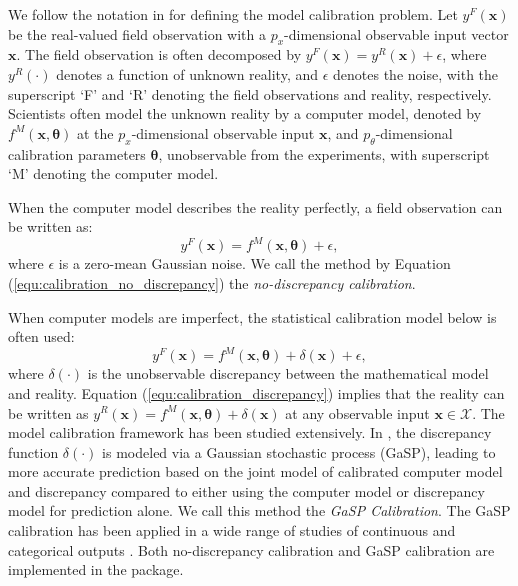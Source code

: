 We follow the notation in \cite{bayarri2007computer} for defining the model calibration problem. Let $y^F(\mathbf x)$ be the real-valued field observation with a $p_x$-dimensional observable input vector $\mathbf x$. The field observation is often decomposed by $y^F(\mathbf x)=y^R(\mathbf x)+\epsilon$, where $y^R(\cdot)$ denotes a function of unknown reality, and $\epsilon$ denotes the noise, with the superscript `F' and `R' denoting the field observations and reality, respectively.  
 Scientists often model the unknown reality by a computer model, denoted by $ f^M(\mathbf x, \bm \theta)$ at the $p_x$-dimensional observable input $\mathbf  x$, and $p_{\theta}$-dimensional calibration parameters $\bm \theta $, unobservable from the experiments, with superscript `M' denoting the computer model. 
 
 When the computer model describes the reality perfectly, a field observation can be written as:
\begin{equation}
y^F(\mathbf x)= f^M(\mathbf x, \bm \theta)+ \epsilon,
\label{equ:calibration_no_discrepancy}
\end{equation}
where  $\epsilon$ is a zero-mean Gaussian noise.  We call the method by Equation (\ref{equ:calibration_no_discrepancy}) the \textit{no-discrepancy calibration}.

When  computer models are imperfect, the statistical calibration model below is often used: 
\begin{equation}
y^F(\mathbf x)= f^M(\mathbf x, \bm \theta)+ \delta(\mathbf x)+\epsilon,
\label{equ:calibration_discrepancy}
\end{equation}
where $\delta(\cdot)$ is the unobservable discrepancy between the mathematical model and reality. Equation (\ref{equ:calibration_discrepancy}) implies that the reality can be written as $y^R(\mathbf x)= f^M(\mathbf x, \bm \theta)+ \delta(\mathbf x)$ at any observable input $\mathbf x \in \mathcal X$.  The model calibration framework has been studied extensively. In \cite{kennedy2001bayesian},  the discrepancy function $\delta(\cdot)$ is modeled via a Gaussian stochastic process (GaSP), leading to more accurate  prediction based on the joint model of calibrated computer model and discrepancy compared to either using the computer model  or discrepancy model for prediction alone.  We call this method the \textit{GaSP Calibration}. The GaSP calibration has been applied in a wide range of studies  of continuous and categorical outputs \citep{bayarri2007computer,higdon2008computer,paulo2012calibration,chang2016calibrating,chang2022ice}. Both no-discrepancy calibration and GaSP calibration are implemented in the  package.


